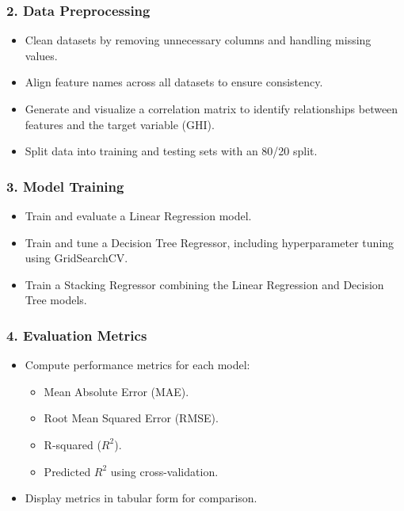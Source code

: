 \documentclass[10pt,twocolumn]{article}
\begin{document}
\begin{itemize}
\subsubsection*{2. Data Preprocessing}
\begin{itemize}
    \item Clean datasets by removing unnecessary columns and handling missing values.
    \item Align feature names across all datasets to ensure consistency.
    \item Generate and visualize a correlation matrix to identify relationships between features and the target variable (GHI).
    \item Split data into training and testing sets with an 80/20 split.
\end{itemize}

\subsubsection*{3. Model Training}
\begin{itemize}
    \item Train and evaluate a Linear Regression model.
    \item Train and tune a Decision Tree Regressor, including hyperparameter tuning using GridSearchCV.
    \item Train a Stacking Regressor combining the Linear Regression and Decision Tree models.
\end{itemize}

\subsubsection*{4. Evaluation Metrics}
\begin{itemize}
    \item Compute performance metrics for each model:
    \begin{itemize}
        \item Mean Absolute Error (MAE).
        \item Root Mean Squared Error (RMSE).
        \item R-squared (\( R^2 \)).
        \item Predicted \( R^2 \) using cross-validation.
    \end{itemize}
    \item Display metrics in tabular form for comparison.
\end{itemize}


\end{itemize}
\end{document}
